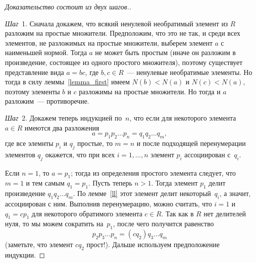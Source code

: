 \documentclass[a4paper,10pt]{amsart}
\theoremstyle{definition}
\theoremstyle{remark}
\begin{document}
\begin{proof}[Доказательство \textup{состоит из двух шагов.}]~

\textit{Шаг}~1. Сначала докажем, что всякий ненулевой необратимый
элемент из $R$ разложим на простые множители. Предположим, что это
не так, и среди всех элементов, не разложимых на простые множители,
выберем элемент $a$ с наименьшей нормой. Тогда $a$ не может быть
простым (иначе он разложим в произведение, состоящее из одного
простого множителя), поэтому существует представление вида $a = bc$,
где $b,c \in R$~--- ненулевые необратимые элементы. Но тогда в силу
леммы~\ref{lemma_first} имеем $N(b) < N(a)$ и $N(c) < N(a)$, поэтому
элементы $b$ и $c$ разложимы на простые множители. Но тогда и $a$
разложим~--- противоречие.

\textit{Шаг}~2. Докажем теперь индукцией по~$n$, что если для
некоторого элемента $a \in R$ имеются два разложения
$$
a = p_1p_2\ldots p_n=q_1q_2\ldots q_m,
$$
где все элемнты $p_i$ и $q_j$ простые, то $m=n$ и после подходящей
перенумерации элементов $q_j$ окажется, что при всех $i = 1,\ldots,
n$ элемент $p_i$ ассоциирован с~$q_i$.

Если $n=1$, то $a = p_1$; тогда из определения простого элемента
следует, что $m = 1$ и тем самым $q_1 = p_1$. Пусть теперь $n > 1$.
Тогда элемент $p_1$ делит произведение $q_1 q_2 \ldots q_m$. По
лемме~\ref{ll} этот элемент делит некоторый~$q_i$, а значит,
ассоциирован с ним. Выполнив перенумерацию, можно считать, что $i =
1$ и $q_1 = cp_1$ для некоторого обратимого элемента $c \in R$. Так
как в $R$ нет делителей нуля, то мы можем сократить на~$p_1$, после
чего получится равенство
$$
p_2 p_3 \ldots p_n = (cq_2)q_3 \ldots q_m
$$
(заметьте, что элемент $cq_2$ прост!). Дальше используем
предположение индукции.
\end{proof}
\end{document}
